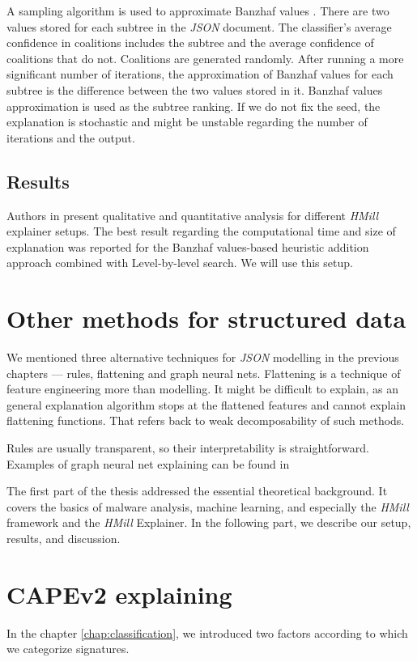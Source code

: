 A sampling algorithm is used to approximate Banzhaf values \cite{Bachrach2010}. There are two values stored for each subtree in the \emph{JSON} document. The classifier's average confidence in coalitions includes the subtree and the average confidence of coalitions that do not. Coalitions are generated randomly. After running a more significant number of iterations, the approximation of Banzhaf values for each subtree is the difference between the two values stored in it. Banzhaf values approximation is used as the subtree ranking. If we do not fix the seed, the explanation is stochastic and might be unstable regarding the number of iterations and the output.

\subsection{Results}
Authors in \cite{Pevny2020} present qualitative and quantitative analysis for different \emph{HMill} explainer setups. The best result regarding the computational time and size of explanation was reported for the Banzhaf values-based heuristic addition approach combined with Level-by-level search. We will use this setup.

\section{Other methods for structured data}
We mentioned three alternative techniques for \emph{JSON} modelling in the previous chapters --- rules, flattening and graph neural nets. Flattening is a technique of feature engineering more than modelling. It might be difficult to explain, as an general explanation algorithm stops at the flattened features and cannot explain flattening functions. That refers back to weak decomposability of such methods.

Rules are usually transparent, so their interpretability is straightforward. Examples of graph neural net explaining can be found in \cite{Ying2019, Huang2020} 

The first part of the thesis addressed the essential theoretical background. It covers the basics of malware analysis, machine learning, and especially the \emph{HMill} framework and the \emph{HMill} Explainer. In the following part, we describe our setup, results, and discussion.

\section{CAPEv2 explaining}
In the chapter \ref{chap:classification}, we introduced two factors according to which we categorize signatures.

